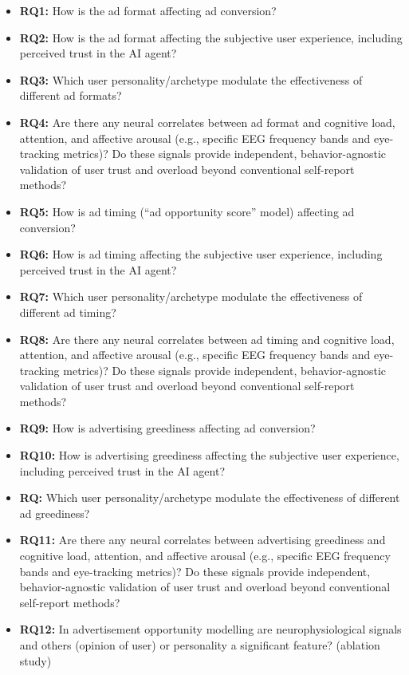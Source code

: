 \documentclass{article}
\begin{document}
\begin{itemize}
    \item \textbf{RQ1:} How is the ad format affecting ad conversion?
    \item \textbf{RQ2:} How is the ad format affecting the subjective user experience, including perceived trust in the AI agent?
    \item \textbf{RQ3:} Which user personality/archetype modulate the effectiveness of different ad formats?
    \item \textbf{RQ4:} Are there any neural correlates between ad format and cognitive load, attention, and affective arousal (e.g., specific EEG frequency bands and eye-tracking metrics)? Do these signals provide independent, behavior-agnostic validation of user trust and overload beyond conventional self-report methods?
    \item \textbf{RQ5:} How is ad timing (``ad opportunity score'' model) affecting ad conversion?
    \item \textbf{RQ6:} How is ad timing affecting the subjective user experience, including perceived trust in the AI agent?
    \item \textbf{RQ7:} Which user personality/archetype modulate the effectiveness of different ad timing?
    \item \textbf{RQ8:} Are there any neural correlates between ad timing and cognitive load, attention, and affective arousal (e.g., specific EEG frequency bands and eye-tracking metrics)? Do these signals provide independent, behavior-agnostic validation of user trust and overload beyond conventional self-report methods?
    \item \textbf{RQ9:} How is advertising greediness affecting ad conversion?
    \item \textbf{RQ10:} How is advertising greediness affecting the subjective user experience, including perceived trust in the AI agent?
    \item \textbf{RQ:} Which user personality/archetype modulate the effectiveness of different ad greediness?
    \item \textbf{RQ11:} Are there any neural correlates between advertising greediness and cognitive load, attention, and affective arousal (e.g., specific EEG frequency bands and eye-tracking metrics)? Do these signals provide independent, behavior-agnostic validation of user trust and overload beyond conventional self-report methods?
    \item \textbf{RQ12:} In advertisement opportunity modelling are neurophysiological signals and others (opinion of user) or personality a significant feature? (ablation study) 
\end{itemize}
\end{document}
